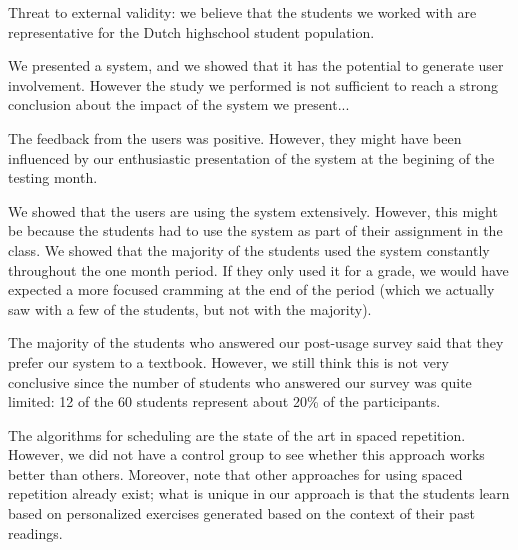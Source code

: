 Threat to external validity: we believe that the students we worked with are representative for the Dutch highschool student population. 

We presented a system, and we showed that it has the potential to generate user involvement. However the study we performed is not sufficient to reach a strong conclusion about the impact of the system we present... 

The feedback from the users was positive. However, they might have been influenced by our enthusiastic presentation of the system at the begining of the testing month. 

We showed that the users are using the system extensively. However, this might be because the students had to use the system as part of their assignment in the class. We showed that the majority of the students used the system constantly throughout the one month period. If they only used it for a grade, we would have expected a more focused cramming at the end of the period (which we actually saw with a few of the students, but not with the majority). 

The majority of the students who answered our post-usage survey said that  they prefer our system to a textbook. However, we still think this is not very conclusive since the number of students who answered our survey was quite limited: 12 of the 60 students represent about 20\% of the participants. 


The algorithms for scheduling are the state of the art in spaced repetition. However, we did not have a control group to see whether this approach works better than others. Moreover, note that other approaches for using spaced repetition already exist; what is unique in our approach is that the students learn based on personalized exercises generated based on the context of their past readings.






